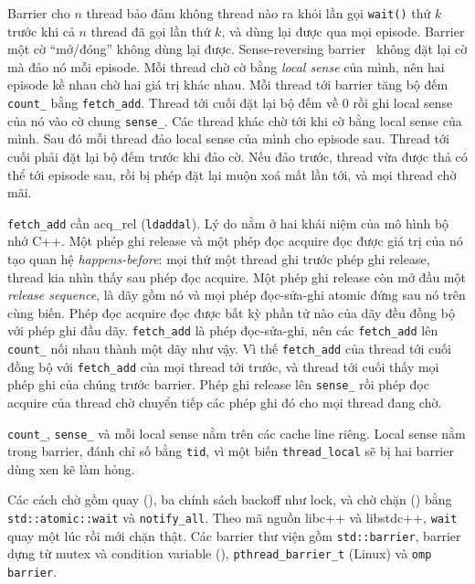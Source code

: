 Barrier cho $n$ thread bảo đảm không thread nào ra khỏi lần gọi \texttt{wait()} thứ $k$ trước khi cả $n$
thread đã gọi lần thứ $k$, và dùng lại được qua mọi episode. Barrier một cờ ``mở/đóng'' không dùng lại
được. Sense-reversing barrier~\cite{hensgen1988barrier} không đặt lại cờ mà đảo nó mỗi episode. Mỗi
thread chờ cờ bằng \emph{local sense} của mình, nên hai episode kề nhau chờ hai giá trị khác nhau. Mỗi
thread tới barrier tăng bộ đếm \texttt{count\_} bằng \texttt{fetch\_add}. Thread tới cuối đặt lại bộ đếm
về 0 rồi ghi local sense của nó vào cờ chung \texttt{sense\_}. Các thread khác chờ tới khi cờ bằng local
sense của mình. Sau đó mỗi thread đảo local sense của mình cho episode sau.
Thread tới cuối phải đặt lại bộ đếm trước khi đảo cờ. Nếu đảo trước, thread vừa được thả có thể tới
episode sau, rồi bị phép đặt lại muộn xoá mất lần tới, và mọi thread chờ mãi.

\texttt{fetch\_add} cần acq\_rel (\texttt{ldaddal}). Lý do nằm ở hai khái niệm của mô hình bộ nhớ C++.
Một phép ghi release và một phép đọc acquire đọc được giá trị của nó tạo quan hệ \emph{happens-before}:
mọi thứ một thread ghi trước phép ghi release, thread kia nhìn thấy sau phép đọc acquire. Một phép ghi
release còn mở đầu một \emph{release sequence}, là dãy gồm nó và mọi phép đọc-sửa-ghi atomic đứng sau
nó trên cùng biến. Phép đọc acquire đọc được bất kỳ phần tử nào của dãy đều đồng bộ với phép ghi đầu
dãy. \texttt{fetch\_add} là phép đọc-sửa-ghi, nên các \texttt{fetch\_add} lên \texttt{count\_} nối nhau
thành một dãy như vậy. Vì thế \texttt{fetch\_add} của thread tới cuối đồng bộ với \texttt{fetch\_add}
của mọi thread tới trước, và thread tới cuối thấy mọi phép ghi của chúng trước barrier. Phép ghi release
lên \texttt{sense\_} rồi phép đọc acquire của thread chờ chuyển tiếp các phép ghi đó cho mọi thread đang
chờ.

\texttt{count\_}, \texttt{sense\_} và mỗi local sense nằm trên các cache line riêng. Local sense nằm trong barrier, đánh chỉ số bằng \texttt{tid}, vì một biến \texttt{thread\_local}
sẽ bị hai barrier dùng xen kẽ làm hỏng.

Các cách chờ gồm quay (), ba chính sách backoff như lock, và chờ chặn () bằng
\texttt{std::atomic::wait} và \texttt{notify\_all}. Theo mã nguồn libc++ và libstdc++, \texttt{wait}
quay một lúc rồi mới chặn thật. Các barrier thư viện gồm \texttt{std::barrier}, barrier dựng từ mutex và
condition variable (), \texttt{pthread\_barrier\_t} (Linux) và \texttt{omp barrier}.
